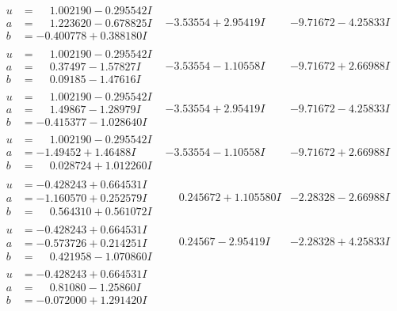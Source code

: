 \documentclass[1p]{elsarticle_modified}
\theoremstyle{definition}
\begin{document}
$$\begin{array}{c|c|c}
\begin{aligned}
u &= \phantom{-}1.002190 - 0.295542 I \\
a &= \phantom{-}1.223620 - 0.678825 I \\
b &= -0.400778 + 0.388180 I\end{aligned}
 & -3.53554 + 2.95419 I & -9.71672 - 4.25833 I \\ \hline\begin{aligned}
u &= \phantom{-}1.002190 - 0.295542 I \\
a &= \phantom{-}0.37497 - 1.57827 I \\
b &= \phantom{-}0.09185 - 1.47616 I\end{aligned}
 & -3.53554 - 1.10558 I & -9.71672 + 2.66988 I \\ \hline\begin{aligned}
u &= \phantom{-}1.002190 - 0.295542 I \\
a &= \phantom{-}1.49867 - 1.28979 I \\
b &= -0.415377 - 1.028640 I\end{aligned}
 & -3.53554 + 2.95419 I & -9.71672 - 4.25833 I \\ \hline\begin{aligned}
u &= \phantom{-}1.002190 - 0.295542 I \\
a &= -1.49452 + 1.46488 I \\
b &= \phantom{-}0.028724 + 1.012260 I\end{aligned}
 & -3.53554 - 1.10558 I & -9.71672 + 2.66988 I \\ \hline\begin{aligned}
u &= -0.428243 + 0.664531 I \\
a &= -1.160570 + 0.252579 I \\
b &= \phantom{-}0.564310 + 0.561072 I\end{aligned}
 & \phantom{-}0.245672 + 1.105580 I & -2.28328 - 2.66988 I \\ \hline\begin{aligned}
u &= -0.428243 + 0.664531 I \\
a &= -0.573726 + 0.214251 I \\
b &= \phantom{-}0.421958 - 1.070860 I\end{aligned}
 & \phantom{-}0.24567 - 2.95419 I & -2.28328 + 4.25833 I \\ \hline\begin{aligned}
u &= -0.428243 + 0.664531 I \\
a &= \phantom{-}0.81080 - 1.25860 I \\
b &= -0.072000 + 1.291420 I\end{aligned}

\end{array}$$
\end{document}
